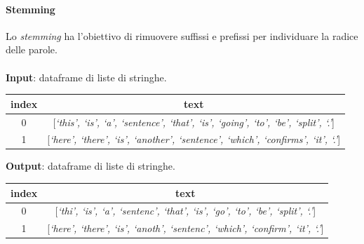 \documentclass[12pt]{report}
\theoremstyle{definition}
\begin{document}
\paragraph{Stemming}
Lo \textit{stemming} ha l'obiettivo di rimuovere suffissi e prefissi per individuare la radice delle parole.
\\
\\
\textbf{Input}: dataframe di liste di stringhe.
\begin{center}
    \begin{tabular}{|c|c|}
    \hline
    \textbf{index} & \textbf{text} \\
    \hline
         0 & [\textit{`this', `is', `a', `sentence', `that', `is', `going', `to', `be', `split', `.'}]\\
         1 & [\textit{`here', `there', `is', `another', `sentence', `which', `confirms', `it', `.'}]\\
    \hline
    \end{tabular}
\end{center}
\textbf{Output}: dataframe di liste di stringhe.
\begin{center}
    \begin{tabular}{|c|c|}
    \hline
    \textbf{index} & \textbf{text} \\
    \hline
         0 & [\textit{`thi', `is', `a', `sentenc', `that', `is', `go', `to', `be', `split', `.'}]\\
         1 & [\textit{`here', `there', `is', `anoth', `sentenc', `which', `confirm', `it', `.'}]\\
    \hline
    \end{tabular}
\end{center}
\end{document}
